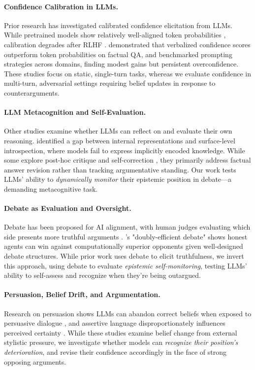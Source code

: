 \documentclass{article}
\begin{document}
\paragraph{Confidence Calibration in LLMs.}
Prior research has investigated calibrated confidence elicitation from LLMs. While pretrained models show relatively well-aligned token probabilities \citep{kadavath2022know}, calibration degrades after RLHF \citep{west2025basemodelsbeataligned,openai2024gpt4technicalreport}. \citet{tian2023justask} demonstrated that verbalized confidence scores outperform token probabilities on factual QA, and \citet{xiong2024uncertainty} benchmarked prompting strategies across domains, finding modest gains but persistent overconfidence. These studies focus on static, single-turn tasks, whereas we evaluate confidence in multi-turn, adversarial settings requiring belief updates in response to counterarguments.

\paragraph{LLM Metacognition and Self-Evaluation.}
Other studies examine whether LLMs can reflect on and evaluate their own reasoning. \citet{song2025introspect} identified a gap between internal representations and surface-level introspection, where models fail to express implicitly encoded knowledge. While some explore post-hoc critique and self-correction \cite{Li2024ConfidenceMR}, they primarily address factual answer revision rather than tracking argumentative standing. Our work tests LLMs' ability to \textit{dynamically monitor} their epistemic position in debate—a demanding metacognitive task.

\paragraph{Debate as Evaluation and Oversight.}
Debate has been proposed for AI alignment, with human judges evaluating which side presents more truthful arguments \citep{irving2018debate}. \citet{browncohen2023debate}'s "doubly-efficient debate" shows honest agents can win against computationally superior opponents given well-designed debate structures. While prior work uses debate to elicit truthfulness, we invert this approach, using debate to evaluate \textit{epistemic self-monitoring}, testing LLMs' ability to self-assess and recognize when they're being outargued.

\paragraph{Persuasion, Belief Drift, and Argumentation.}
Research on persuasion shows LLMs can abandon correct beliefs when exposed to persuasive dialogue \citep{xu2023earthflat}, and assertive language disproportionately influences perceived certainty \citep{zhou2023epistemic,rivera2023assertive,agarwal2025persuasionoverridestruthmultiagent}. While these studies examine belief change from external stylistic pressure, we investigate whether models can \textit{recognize their position's deterioration}, and revise their confidence accordingly in the face of strong opposing arguments.
\end{document}
